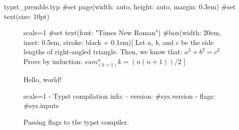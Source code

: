 \documentclass{article}
\begin{document}
\begin{filecontents}[overwrite]{typst_premble.typ}
#set page(width: auto, height: auto, margin: 0.3em)
#set text(size: 10pt)
\end{filecontents}

\begin{figure}[h]
    \centering
    \begin{typst}{scale=1}
    #set text(font: "Times New Roman")
    #box(width: 20em, inset: 0.5em, stroke: black + 0.1em)[
        Let $a$, $b$, and $c$ be the side
        lengths of right-angled triangle.
        Then, we know that:
        $ a^2 + b^2 = c^2 $
        Prove by induction:
        $ sum_(k=1)^n k = (n(n+1)) / 2 $
    ]
    \end{typst}
    \caption{Hello, world!}
\end{figure}

\renewcommand{\typstflags}{--input a=b}
\begin{figure}[h]
    \centering
    \begin{typst}{scale=1}
        - Typst compilation info:
            - version: #sys.version
            - flags: #sys.inputs
    \end{typst}
    \caption{Passing flags to the typst compiler.}
\end{figure}
\end{document}
